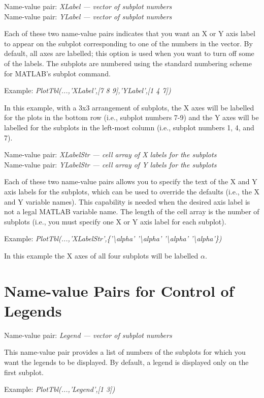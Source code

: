 \documentclass{article}
\newcommand{\example}[1]{Example: {\it #1}}
\newcommand{\namevalue}[2]{{\it #1 --- #2}}
\begin{document}
Name-value pair: \namevalue{XLabel}{vector of subplot numbers} \\
Name-value pair: \namevalue{YLabel}{vector of subplot numbers}

Each of these two name-value pairs indicates that you want an X or Y axis label to appear
on the subplot corresponding to one of the numbers in the vector.
By default, all axes are labelled; this option is used when you want to turn off
some of the labels.
The subplots are numbered using the standard numbering scheme for MATLAB's subplot command.

\example{PlotTbl(...,'XLabel',[7 8 9],'YLabel',[1 4 7])}

In this example, with a 3x3 arrangement of subplots, the X axes will
be labelled for the plots in the bottom row (i.e., subplot numbers 7-9) and the Y axes
will be labelled for the subplots in the left-most column (i.e., subplot numbers 1, 4, and 7).

Name-value pair: \namevalue{XLabelStr}{cell array of X labels for the subplots} \\
Name-value pair: \namevalue{YLabelStr}{cell array of Y labels for the subplots}

Each of these two name-value pairs allows you to specify the text of the X and Y axis labels for the
subplots, which can be used to override the defaults (i.e., the X and Y variable names).
This capability is needed when the desired axis label is not a legal MATLAB variable name.
The length of the cell array is the number of subplots (i.e., you must specify
one X or Y axis label for each subplot).

\example{PlotTbl(...,'XLabelStr',\{'\textbackslash alpha' '\textbackslash alpha' '\textbackslash alpha' '\textbackslash alpha'\})}

In this example the X axes of all four subplots will be labelled $\alpha$.

\section{Name-value Pairs for Control of Legends}

Name-value pair: \namevalue{Legend}{vector of subplot numbers}

This name-value pair provides a list of numbers of the subplots for which you want the legends to be displayed.
By default, a legend is displayed only on the first subplot.

\example{PlotTbl(...,'Legend',[1 3])}
\end{document}

